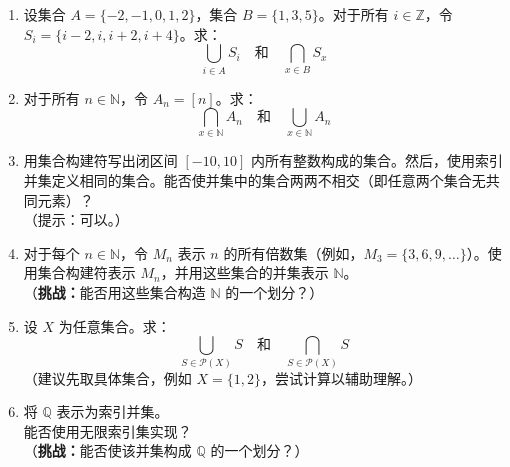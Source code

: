 \begin{enumerate}[label=(\arabic*)]
    \item 设集合 $A = \{-2, -1, 0, 1, 2\}$，集合 $B = \{1, 3, 5\}$。对于所有 $i \in \mathbb{Z}$，令 $S_i = \{i - 2, i, i + 2, i + 4\}$。求：
    \[\bigcup_{i \in A}S_i \quad \text{和} \quad \bigcap_{x \in B}S_x\]
    \item 对于所有 $n \in \mathbb{N}$，令 $A_n = [n]$。求：
    \[\bigcap_{x \in \mathbb{N}}A_n \quad \text{和} \quad \bigcup_{x \in \mathbb{N}}A_n\]
    \item 用集合构建符写出闭区间 $[-10, 10]$ 内所有整数构成的集合。然后，使用索引并集定义相同的集合。能否使并集中的集合两两不相交（即任意两个集合无共同元素）？\\（提示：可以。）
    \item 对于每个 $n \in \mathbb{N}$，令 $M_n$ 表示 $n$ 的所有倍数集（例如，$M_3 = \{3, 6, 9,\dots\}$）。使用集合构建符表示 $M_n$，并用这些集合的并集表示 $\mathbb{N}$。\\
    （\textbf{挑战：}能否用这些集合构造 $\mathbb{N}$ 的一个划分？）
    \item 设 $X$ 为任意集合。求：
    \[\bigcup_{S \in \mathcal{P}(X)}S \quad \text{和} \quad \bigcap_{S \in \mathcal{P}(X)}S\] 
    （建议先取具体集合，例如 $X = \{1, 2\}$，尝试计算以辅助理解。）
    \item 将 $\mathbb{Q}$ 表示为索引并集。\\
    能否使用无限索引集实现？\\
    （\textbf{挑战：}能否使该并集构成 $\mathbb{Q}$ 的一个划分？）
\end{enumerate}